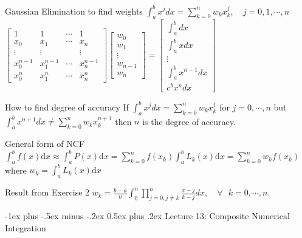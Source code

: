 \documentclass[10pt,landscape]{article}
\makeatletter
\renewcommand{\section}{\@startsection{section}{1}{0mm}%
                                {-1ex plus -.5ex minus -.2ex}%
                                {0.5ex plus .2ex}%
                                {\normalfont\large\bfseries}}
\theoremstyle{definition}
\newcommand{\thistheoremname}{}
\newtheorem*{genericthm*}{\thistheoremname}
\newenvironment{namedthm*}[1]
{\renewcommand{\thistheoremname}{#1}\begin{genericthm*}}
{\end{genericthm*}}
\makeatother
\begin{document}
\begin{multicols}{3}
\begin{namedthm*}{Gaussian Elimination to find weights}
		\(\int_{a}^{b} x^{j} d x=\sum_{k=0}^{n} w_{k} x_{k}^{j}, \quad j=0,1, \cdots, n\)\\\(\left[\begin{array}{ccccc}{1} & {1} & {\cdots} & {1} \\ {x_{0}} & {x_{1}} & {\cdots}  & {x_{n}} \\ {\vdots} & {\vdots} & {} & {\vdots} \\ {x_{0}^{n-1}} & {x_{1}^{n-1}} & {\cdots} & {x_{n}^{n-1}} \\ {x_{0}^{n}} & {x_{1}^{n}} & {\cdots} & {x_{n}^{n}}\end{array}\right]\left[\begin{array}{c}{w_{0}} \\ {w_{1}} \\ {\vdots} \\ {w_{n-1}} \\ {w_{n}}\end{array}\right]=\left[\begin{array}{c}{\int_{a}^{b} d x} \\ {\int_{a}^{b} x d x} \\ {\vdots} \\ {\int_{a}^{b} x^{n-1} d x} \\ {c^{b} x^{n} d x}\end{array}\right]\)
	\end{namedthm*}
	\begin{namedthm*}{How to find degree of accuracy}
		If \(\int_a^bx^jdx = \sum_{k=0}^nw_kx_k^j\) for \(j = 0,\cdots,n\) but \(\int_a^bx^{n+1}dx \neq \sum_{k=0}^nw_kx_k^{n+1}\) then \(n\) is the degree of accuracy.
	\end{namedthm*}
	\begin{namedthm*}{General form of NCF}
		\(\int_{a}^{b} f(x) \mathrm{d} x \approx \int_{a}^{b} P(x) \mathrm{d} x=\sum_{k=0}^{n} f\left(x_{k}\right) \int_{a}^{b} L_{k}(x) \mathrm{d} x=\sum_{k=0}^{n} w_{k} f\left(x_{k}\right)\) where \(w_{k}=\int_{a}^{b} L_{k}(x) \mathrm{d} x\)
	\end{namedthm*}
	\begin{namedthm*}{Result from Exercise 2}
		\(w_k=\frac{b-a}{n}\int_0^n\prod_{j=0,j\neq k}^{n}\frac{x-j}{k-j}dx, \quad \forall \text{ } k = 0,\cdots,n.\)
	\end{namedthm*}
	\section{Lecture 13: Composite Numerical Integration}


\end{multicols}
\end{document}
